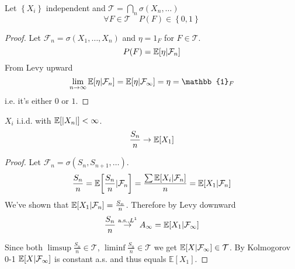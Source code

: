 \begin{theorem}
	Let $\left\{X_i\right\}$ independent and $\mathcal{T} = \bigcap_n \sigma(X_n,\dots)$ 
	$$\forall F\in \mathcal{T} \quad P(F) \in \left\{0,1\right\}$$
	\begin{proof}
		Let $\mathcal{F}_n = \sigma(X_1, \dots, X_n)$ and $\eta = 1_F$ for $F\in \mathcal{T}$.
		$$P(F) = \mathbb{E} \qty[\eta | \mathcal{F}_n]$$
		From Levy upward $$\lim_{n\to\infty}  \mathbb{E} \qty[\eta | \mathcal{F}_n] = \mathbb{E} \qty[\eta | \mathcal{F}_\infty]= \eta = \mathbb{1}_F$$
		i.e. it's either $0$ or $1$.
	\end{proof}
\end{theorem}


\begin{theorem}
	$X_i$ i.i.d. with $\mathbb{E} [\abs{X_n}] <\infty$.
	$$\frac{S_n}{n} \to \mathbb{E} \qty[X_1]$$
		\begin{proof}	
	Let $\mathcal{F}_n = \sigma(S_n, S_{n+1}, \dots)$.
	$$\frac{S_n}{n} = \mathbb{E} \qty[\frac{S_n}{n} | \mathcal{F}_n] = \frac{\sum \mathbb{E} \qty[X_i |\mathcal{F}_n] }{n} =  \mathbb{E} \qty[X_1 | \mathcal{F}_n]$$
	We've shown that $\mathbb{E} \qty[X_1 | \mathcal{F}_n] = \frac{S_n}{n}$. Therefore by Levy downward
	$$\frac{S_n}{n} \stackrel{\text{a.s.}, L^1}{\to} A_\infty =  \mathbb{E} \qty[X_1 | \mathcal{F}_\infty]$$
	
	Since both $\limsup \frac{S_n}{n} \in \mathcal{T}$, $\liminf \frac{S_n}{n} \in \mathcal{T}$ we get $\mathbb{E} \qty[X|\mathcal{F}_\infty] \in \mathcal{T}$. By Kolmogorov 0-1 $\mathbb{E} \qty[X|\mathcal{F}_\infty]$ is constant a.s. and thus equals $\mathbb{E} [X_1]$.
	
\end{proof}
\end{theorem}